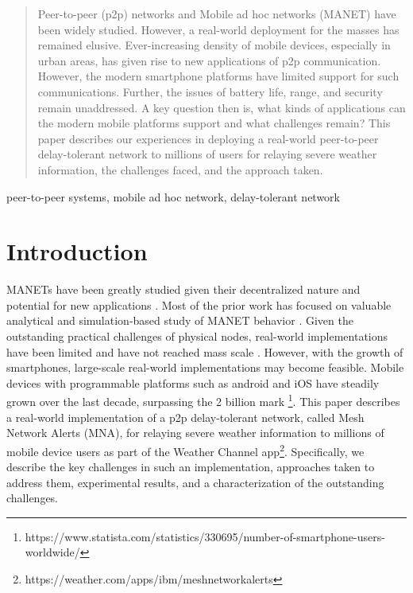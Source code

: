 \documentclass[conference]{IEEEtran}
\begin{document}
\begin{abstract}
Peer-to-peer (p2p) networks and Mobile ad hoc networks (MANET) have been widely studied. However, a real-world deployment for the masses has remained elusive. Ever-increasing density of mobile devices, especially in urban areas, has given rise to new applications of p2p communication. However, the modern smartphone platforms have limited support for such communications. Further, the issues of battery life, range, and security remain unaddressed. A key question then is, what kinds of applications can the modern mobile platforms support and what challenges remain? This paper describes our experiences in deploying a real-world peer-to-peer delay-tolerant network to millions of users for relaying severe weather information, the challenges faced, and the approach taken.
\end{abstract}

\begin{IEEEkeywords}
peer-to-peer systems, mobile ad hoc network, delay-tolerant network
\end{IEEEkeywords}

\section{Introduction}
MANETs have been greatly studied given their decentralized nature and potential for new applications \cite{loo-manet-2011,perkins-ad-hoc-2001}. Most of the prior work has focused on valuable analytical and simulation-based study of MANET behavior \cite{zhang-topology-manet-2015,marti-misbehavior-manet-2000,mauve-pos-routing-manet-2001}. Given the outstanding practical challenges of physical nodes, real-world implementations have been limited and have not reached mass scale \cite{kiess-manet-impl-2007}. However, with the growth of smartphones, large-scale real-world implementations may become feasible. Mobile devices with programmable platforms such as android and iOS have steadily grown over the last decade, surpassing the 2 billion mark \footnote{https://www.statista.com/statistics/330695/number-of-smartphone-users-worldwide/}. This paper describes a real-world implementation of a p2p delay-tolerant network, called Mesh Network Alerts (MNA), for relaying severe weather information to millions of mobile device users as part of the Weather Channel app\footnote{https://weather.com/apps/ibm/meshnetworkalerts}. Specifically, we describe the key challenges in such an implementation, approaches taken to address them, experimental results, and a characterization of the outstanding challenges.
\end{document}
